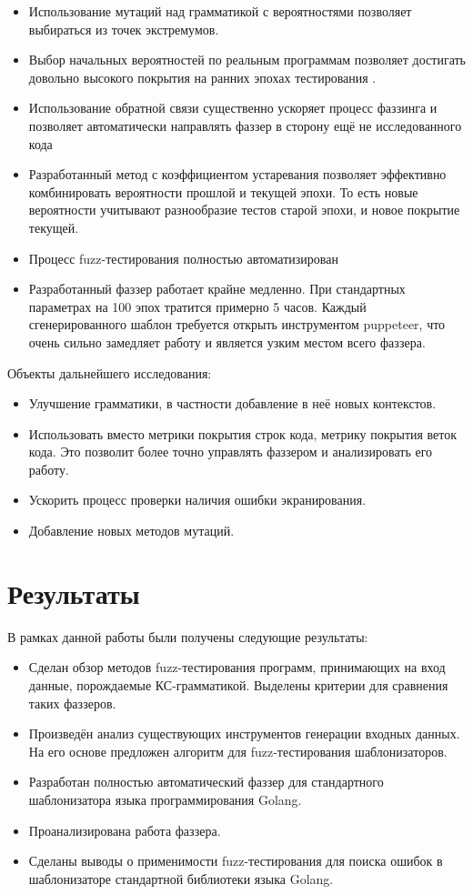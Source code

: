 \documentclass[a4paper]{article}
\begin{document}
\begin{itemize}
    \item Использование мутаций над грамматикой с вероятностями позволяет выбираться из точек экстремумов.
    \item Выбор начальных вероятностей по реальным программам позволяет достигать довольно высокого покрытия на ранних эпохах тестирования
    .
    \item Использование обратной связи существенно ускоряет процесс фаззинга и позволяет автоматически направлять фаззер в сторону ещё не исследованного кода
    \item Разработанный метод с коэффициентом устаревания позволяет эффективно комбинировать вероятности прошлой и текущей эпохи. То есть новые вероятности учитывают разнообразие тестов старой эпохи, и новое покрытие текущей.
    \item Процесс fuzz-тестирования полностью автоматизирован
    \item Разработанный фаззер работает крайне медленно. При стандартных параметрах на 100 эпох тратится примерно 5 часов. Каждый сгенерированного шаблон требуется открыть инструментом puppeteer, что очень сильно замедляет работу и является узким местом всего фаззера.
\end{itemize}


Объекты дальнейшего исследования:

\begin{itemize}
    \item Улучшение грамматики, в частности добавление в неё новых контекстов.
    \item Использовать вместо метрики покрытия строк кода, метрику покрытия веток кода. Это позволит более точно управлять фаззером и анализировать его работу.
    \item Ускорить процесс проверки наличия ошибки экранирования.
    \item Добавление новых методов мутаций.
\end{itemize}

\newpage
\section{Результаты}
\indent

В рамках данной работы были получены следующие результаты:
\begin{itemize}
    \item Сделан обзор методов fuzz-тестирования программ, принимающих на вход данные, порождаемые КС-грамматикой. Выделены критерии для сравнения таких фаззеров.
    \item Произведён анализ существующих инструментов генерации входных данных. На его основе предложен алгоритм для fuzz-тестирования шаблонизаторов.
    \item Разработан полностью автоматический фаззер для стандартного шаблонизатора
    языка программирования Golang.
    \item Проанализирована работа фаззера.
    \item Сделаны выводы о применимости fuzz-тестирования для поиска ошибок в шаблонизаторе стандартной библиотеки языка Golang.
\end{itemize}
\end{document}
